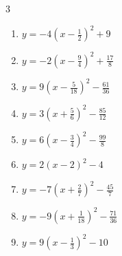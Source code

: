 \begin{multicols}{3}
\begin{enumerate}
        \phantom{$\displaystyle 頂点\left( 0 , 6 \right)$}

  \item $\displaystyle y=-4\left( x-\frac{1}{2}\right)^{2}+9$


  \item $\displaystyle y=-2\left( x-\frac{9}{4}\right)^{2}+\frac{17}{8}$


\columnbreak %

\resetques

  \item $\displaystyle y=9\left( x-\frac{5}{18}\right)^{2}-\frac{61}{36}$


  \item $\displaystyle y=3\left( x+\frac{5}{6}\right)^{2}-\frac{85}{12}$


  \item $\displaystyle y=6\left( x-\frac{3}{4}\right)^{2}-\frac{99}{8}$


  \item $\displaystyle y=2\left( x-2\right)^{2}-4$

        \phantom{$\displaystyle 頂点\left( 2 , -4 \right)$}

  \item $\displaystyle y=-7\left( x+\frac{2}{7}\right)^{2}-\frac{45}{7}$


  \item $\displaystyle y=-9\left( x+\frac{1}{18}\right)^{2}-\frac{71}{36}$


  \item $\displaystyle y=9\left( x-\frac{1}{3}\right)^{2}-10$



\end{enumerate}
\end{multicols}
